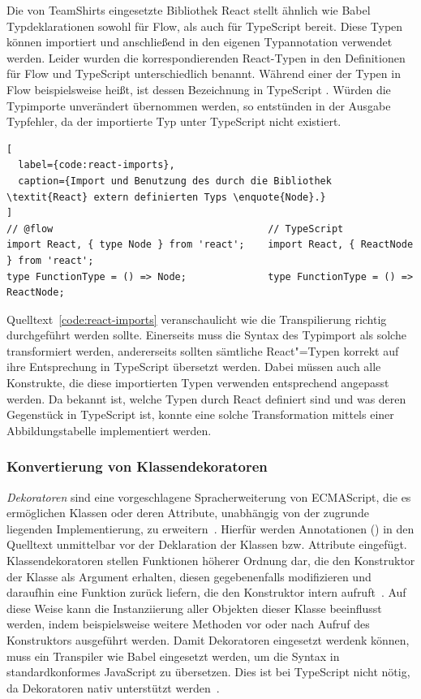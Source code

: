 {Die von TeamShirts eingesetzte Bibliothek React stellt ähnlich wie Babel Typdeklarationen sowohl für Flow, als auch für TypeScript bereit. Diese Typen können importiert und anschließend in den eigenen Typannotation verwendet werden. Leider wurden die korrespondierenden React-Typen in den Definitionen für Flow und TypeScript unterschiedlich benannt. Während einer der Typen in Flow beispielsweise  heißt, ist dessen Bezeichnung in TypeScript . Würden die Typimporte unverändert übernommen werden, so entstünden in der Ausgabe Typfehler, da der importierte Typ unter TypeScript nicht existiert.

\begin{lstlisting}[
  label={code:react-imports},
  caption={Import und Benutzung des durch die Bibliothek \textit{React} extern definierten Typs \enquote{Node}.}
]
// @flow                                     // TypeScript
import React, { type Node } from 'react';    import React, { ReactNode } from 'react';
type FunctionType = () => Node;              type FunctionType = () => ReactNode;
\end{lstlisting}

Quelltext~\ref{code:react-imports} veranschaulicht wie die Transpilierung richtig durchgeführt werden sollte. Einerseits muss die Syntax des Typimport als solche transformiert werden, andererseits sollten sämtliche React"=Typen korrekt auf ihre Entsprechung in TypeScript übersetzt werden. Dabei müssen auch alle Konstrukte, die diese importierten Typen verwenden entsprechend angepasst werden. Da bekannt ist, welche Typen durch React definiert sind und was deren Gegenstück in TypeScript ist, konnte eine solche Transformation mittels einer Abbildungstabelle implementiert werden.

\subsubsection{Konvertierung von Klassendekoratoren}
\label{subsec:class-decorators}

\textit{Dekoratoren} sind eine vorgeschlagene Spracherweiterung von ECMAScript, die es ermöglichen Klassen oder deren Attribute, unabhängig von der zugrunde liegenden Implementierung, zu erweitern~\autocite{ES_PROPOSAL:DECORATORS}. Hierfür werden Annotationen () in den Quelltext unmittelbar vor der Deklaration der Klassen bzw. Attribute eingefügt. Klassendekoratoren stellen Funktionen höherer Ordnung dar, die den Konstruktor der Klasse als Argument erhalten, diesen gegebenenfalls modifizieren und daraufhin eine Funktion zurück liefern, die den Konstruktor intern aufruft~\autocite{ES_PROPOSAL:DECORATORS}. Auf diese Weise kann die Instanziierung aller Objekten dieser Klasse beeinflusst werden, indem beispielsweise weitere Methoden vor oder nach Aufruf des Konstruktors ausgeführt werden. Damit Dekoratoren eingesetzt werdenk können, muss ein Transpiler wie Babel eingesetzt werden, um die Syntax in standardkonformes JavaScript zu übersetzen. Dies ist bei TypeScript nicht nötig, da Dekoratoren nativ unterstützt werden~\autocite{TYPESCRIPT_HANDBOOK:DECORATORS}.

}
